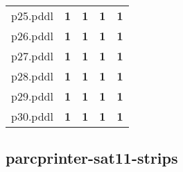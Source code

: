 \documentclass{article}
\begin{document}
\begin{tabular}{@{}lrrrr@{}}
p25.pddl & \textbf{1} & \textbf{1} & \textbf{1} & \textbf{1} \\
p26.pddl & \textbf{1} & \textbf{1} & \textbf{1} & \textbf{1} \\
p27.pddl & \textbf{1} & \textbf{1} & \textbf{1} & \textbf{1} \\
p28.pddl & \textbf{1} & \textbf{1} & \textbf{1} & \textbf{1} \\
p29.pddl & \textbf{1} & \textbf{1} & \textbf{1} & \textbf{1} \\
p30.pddl & \textbf{1} & \textbf{1} & \textbf{1} & \textbf{1} \\
\end{tabular}

\hypertarget{coverage-parcprinter-sat11-strips}{}
\subsection*{parcprinter-sat11-strips}
\end{document}

